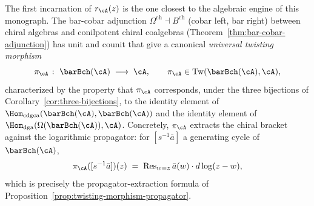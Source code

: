 The first incarnation of $r_\cA(z)$ is the one closest to the
algebraic engine of this monograph. The bar-cobar adjunction
$\Omega^{\mathrm{ch}} \dashv B^{\mathrm{ch}}$ (cobar left, bar right) between chiral
algebras and conilpotent chiral coalgebras (Theorem~\ref{thm:bar-cobar-adjunction}) has unit and
counit that give a canonical \emph{universal twisting morphism}
\begin{equation}\label{eq:hdm-twisting-morphism}
\pi_\cA \;\colon\; \barBch(\cA) \;\longrightarrow\; \cA,
\qquad
\pi_\cA \in \mathrm{Tw}(\barBch(\cA), \cA),
\end{equation}
characterized by the property that $\pi_\cA$ corresponds, under the
three bijections of Corollary~\ref{cor:three-bijections}, to the
identity element of $\Hom_{\mathrm{cdgca}}(\barBch(\cA), \barBch(\cA))$
and the identity element of
$\Hom_{\mathrm{dga}}(\Omega(\barBch(\cA)), \cA)$. Concretely,
$\pi_\cA$ extracts the chiral bracket against the logarithmic
propagator: for $[s^{-1}\bar{a}]$ a generating cycle of $\barBch(\cA)$,
\begin{equation}\label{eq:hdm-twisting-propagator}
\pi_\cA([s^{-1}\bar{a}])(z)
\;=\;
\operatorname{Res}_{w = z}
\bar{a}(w) \cdot d\log(z - w),
\end{equation}
which is precisely the propagator-extraction formula of
Proposition~\ref{prop:twisting-morphism-propagator}.

